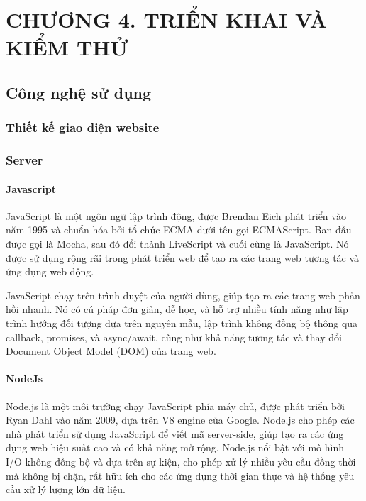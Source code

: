 
\section*{CHƯƠNG 4. TRIỂN KHAI VÀ KIỂM THỬ}
\setcounter{section}{4}
\setcounter{subsection}{0} %
\setcounter{table}{0} %
\setcounter{figure}{0} %

\subsection{Công nghệ sử dụng}
\subsubsection{Thiết kế giao diện website}
\subsubsection{Server}
\paragraph{Javascript}
\mbox{}

JavaScript là một ngôn ngữ lập trình động, được Brendan Eich phát triển vào năm 1995 và chuẩn hóa bởi tổ chức ECMA dưới tên gọi ECMAScript. Ban đầu được gọi là Mocha, sau đó đổi thành LiveScript và cuối cùng là JavaScript. Nó được sử dụng rộng rãi trong phát triển web để tạo ra các trang web tương tác và ứng dụng web động.

JavaScript chạy trên trình duyệt của người dùng, giúp tạo ra các trang web phản hồi nhanh. Nó có cú pháp đơn giản, dễ học, và hỗ trợ nhiều tính năng như lập trình hướng đối tượng dựa trên nguyên mẫu, lập trình không đồng bộ thông qua callback, promises, và async/await, cũng như khả năng tương tác và thay đổi Document Object Model (DOM) của trang web.\cite{js_1}


\paragraph{NodeJs}
\mbox{}

Node.js là một môi trường chạy JavaScript phía máy chủ, được phát triển bởi Ryan Dahl vào năm 2009, dựa trên V8 engine của Google. Node.js cho phép các nhà phát triển sử dụng JavaScript để viết mã server-side, giúp tạo ra các ứng dụng web hiệu suất cao và có khả năng mở rộng. Node.js nổi bật với mô hình I/O không đồng bộ và dựa trên sự kiện, cho phép xử lý nhiều yêu cầu đồng thời mà không bị chặn, rất hữu ích cho các ứng dụng thời gian thực và hệ thống yêu cầu xử lý lượng lớn dữ liệu.\cite{nodejs}

